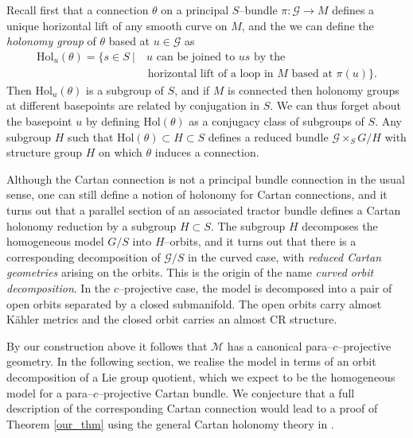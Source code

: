 Recall first that a connection $\theta$ on a principal $S$--bundle $\pi:\mathcal{G}\rightarrow M$ defines a unique horizontal lift of any smooth curve on $M$, and the we can define the \textit{holonomy group} of $\theta$ based at $u\in \mathcal{G}$ as
\begin{align*}
\mathrm{Hol}_u(\theta)=\{s\in S\ |&\ u\mbox{ can be joined to }us\mbox{ by the}\\
&\mbox{ horizontal lift of a loop in }M\mbox{ based at }\pi(u)\}.
\end{align*}
Then $\mathrm{Hol}_u(\theta)$ is a subgroup of $S$, and if $M$ is connected then holonomy groups at different basepoints are related by conjugation in $S$. We can thus forget about the basepoint $u$ by defining $\mathrm{Hol}(\theta)$ as a conjugacy class of subgroups of $S$. Any subgroup ${H}$ such that $\mathrm{Hol}(\theta)\subset 
{H}\subset S$ defines a reduced bundle $\mathcal{G}\times_S G/{H}$ with structure group $H$ on which $\theta$ induces a connection. %

Although the Cartan connection is not a principal bundle connection in the usual sense, one can still define a notion of holonomy for Cartan connections, and it turns out \cite{CGH-duke} that a parallel section of an associated tractor bundle defines a Cartan holonomy reduction by a subgroup $H\subset S$. The subgroup $H$ decomposes the homogeneous model $G/S$ into $H$--orbits, and it turns out that there is a corresponding decomposition of $\mathcal{G}/S$ in the curved case, with \textit{reduced Cartan geometries} arising on the orbits. This is the origin of the name \textit{curved orbit decomposition}. In the $c$--projective case, the model is decomposed into a pair of open orbits separated by a closed submanifold. The open orbits carry almost K\"ahler metrics and the closed orbit carries an almost CR structure.

By our construction above it follows that $\mathcal{M}$ has a canonical para--$c$--projective geometry. In the following section, we realise the model in terms of an orbit decomposition of a Lie group quotient, which we expect to be the homogeneous model for a para--$c$--projective Cartan bundle. We conjecture that a full description of the corresponding Cartan connection would lead to a proof of Theorem \ref{our_thm} using the general Cartan holonomy theory in \cite{CGH-duke}.


